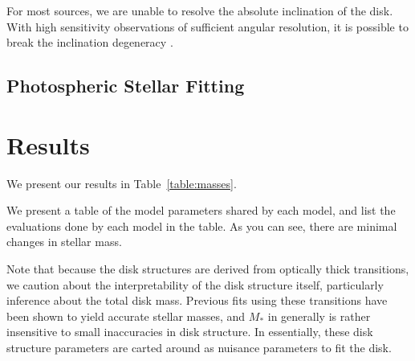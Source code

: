 \documentclass{aastex6}
\begin{document}
For most sources, we are unable to resolve the absolute inclination of the disk. With high sensitivity observations of sufficient angular resolution, it is possible to break the inclination degeneracy \citep[e.g., see]{rosenfeld12b}.

\subsection{Photospheric Stellar Fitting}

\section{Results}

We present our results in Table~\ref{table:masses}.

We present a table of the model parameters shared by each model, and list the evaluations done by each model in the table. As you can see, there are minimal changes in stellar mass.

Note that because the disk structures are derived from optically thick transitions, we caution about the interpretability of the disk structure itself, particularly inference about the total disk mass. Previous fits using these transitions have been shown to yield accurate stellar masses, and $M_\ast$ in generally is rather insensitive to small inaccuracies in disk structure. In essentially, these disk structure parameters are carted around as nuisance parameters to fit the disk.


\end{document}
